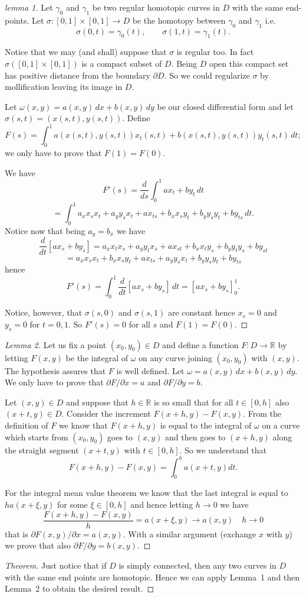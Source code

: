 \documentclass[12pt]{article}
\begin{document}
\begin{proof}[lemma 1]
Let $\gamma_0$ and $\gamma_1$ be two regular homotopic curves in $D$ with 
the same end-points.
Let $\sigma\colon[0,1]\times[0,1]\to D$ be the homotopy between $\gamma_0$ and $\gamma_1$ i.e.
\[
  \sigma(0,t) = \gamma_0(t),\qquad
  \sigma(1,t) = \gamma_1(t).
\]

Notice that we may (and shall) suppose that $\sigma$ is regular too. In fact $\sigma([0,1]\times[0,1])$ is a compact subset of $D$. Being $D$ open this compact set has positive distance from the boundary $\partial D$. So we could
regularize $\sigma$ by mollification leaving its image in $D$.

Let $\omega(x,y) = a(x,y)\, dx + b(x,y)\, dy$ be our closed differential form and let $\sigma(s,t) = (x(s,t),y(s,t))$.
Define 
\[
  F(s) = \int_0^1 a(x(s,t),y(s,t)) x_t(s,t) + b(x(s,t),y(s,t)) y_t (s,t) \, dt;
\]
we only have to prove that $F(1)=F(0)$.

We have
\[
  F'(s) = \frac{d}{ds}\int_0^1 a x_t + b y_t\, dt
\]\[
  = \int_0^1 a_x x_s x_t + a_y y_s x_t + a x_{ts} + b_x x_s y_t + 
     b_y y_s y_t + b y_{ts}\, dt.
\]
Notice now that being $a_y=b_x$ we have
\[
  \frac{d}{dt}\left[ a x_s + b y_s  \right]
  = a_x x_t x_s + a_y y_t x_s + a x_{st} + 
    b_x x_t y_s + b_y y_t y_s + b y_{st}
\]\[
  = a_x x_s x_t + b_x x_s y_t + a x_{ts} +
    a_y y_s x_t + b_y y_s y_t + b y_{ts}
\]
hence
\[
 F'(s) = \int_0^1 \frac{d}{dt}\left[ a x_s + b y_s\right]\, dt
       = \left[ a x_s + b y_s\right]_0^1.
\]

Notice, however, that $\sigma(s,0)$ and $\sigma(s,1)$ are constant hence $x_s=0$ and $y_s=0$  for $t=0,1$. So $F'(s)=0$ for all $s$ and $F(1)=F(0)$.
\end{proof}

\begin{proof}[Lemma 2]
Let us fix a point $(x_0,y_0)\in D$ and define a function $F\colon D\to \mathbb R$ by letting $F(x,y)$ be the integral of $\omega$ on any curve joining $(x_0,y_0)$ with $(x,y)$. The hypothesis assures that $F$ is well defined.
Let $\omega = a(x,y)\, dx + b(x,y)\, dy$. We only have to prove that $\partial F / \partial x = a$ and $\partial F/\partial y=b$.

Let $(x,y)\in D$ and suppose that $h\in \mathbb R$ is so small that for all $t\in [0,h]$ also $(x+t,y)\in D$. Consider the increment $F(x+h,y)-F(x,y)$.
From the definition of $F$ we know that $F(x+h,y)$ is equal to the integral of $\omega$ on a curve which starts from $(x_0,y_0)$ goes to $(x,y)$ and then goes to $(x+h,y)$ along the straight segment $(x+t,y)$ with $t\in [0,h]$.
So we understand that
\[
  F(x+h,y)-F(x,y) = \int_0^h a(x+t,y)dt.
\]

For the integral mean value theorem we know that the last integral is equal to $ha(x+\xi,y)$ for some $\xi \in [0,h]$ and hence letting $h\to 0$ we have
\[
  \frac{F(x+h,y)-F(x,y)}{h} = a(x+\xi,y) \to a(x,y)\quad h\to 0
\]
that is $\partial F(x,y)/\partial x = a(x,y)$. With a similar argument (exchange $x$ with $y$) we prove that also $\partial F/\partial y = b(x,y)$.
\end{proof}

\begin{proof}[Theorem]
Just notice that if $D$ is simply connected, then any two curves in $D$ with the same end points are homotopic. Hence we can apply Lemma~1 and then Lemma~2 to obtain the desired result.
\end{proof}
\end{document}
